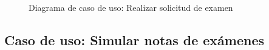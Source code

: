\documentclass[12pt,a4paper]{article}
\begin{document}
\begin{figure}[H]
  \centering
  \caption{Diagrama de caso de uso: Realizar solicitud de examen}
  \label{fig:diagRealizarsolicitud}
\end{figure}

\subsection{Caso de uso: Simular notas de exámenes}
\end{document}
